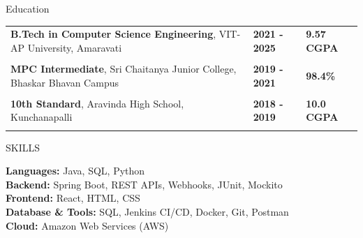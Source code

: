 \documentclass{resume}
\begin{document}






\vspace{-0.9em}
\begin{rSection}{Education}
\begin{tabular}{@{}p{} l l}
    {\bf B.Tech in Computer Science Engineering}, VIT-AP University, Amaravati & {\textbf{2021 - 2025}} & {\textbf{9.57 CGPA}} \\[-1em]
     \\
    {\bf MPC Intermediate}, Sri Chaitanya Junior College, Bhaskar Bhavan Campus & {\textbf{2019 - 2021}} & {\textbf{98.4\%}} \\
    \\[-1em]
    {\bf 10th Standard}, Aravinda High School, Kunchanapalli & {\textbf{2018 - 2019}} & {\textbf{10.0 CGPA}} \\[-1em]
    \\
\end{tabular}
\end{rSection}

\vspace{-0.8em}
\begin{rSection}{SKILLS}

\textbf{Languages:} Java, SQL, Python \\
\textbf{Backend:} Spring Boot, REST APIs, Webhooks, JUnit, Mockito \\
\textbf{Frontend:} React, HTML, CSS \\
\textbf{Database \& Tools:} SQL, Jenkins CI/CD, Docker, Git, Postman\\
\textbf{Cloud:} Amazon Web Services (AWS)


\end{rSection}
\end{document}
